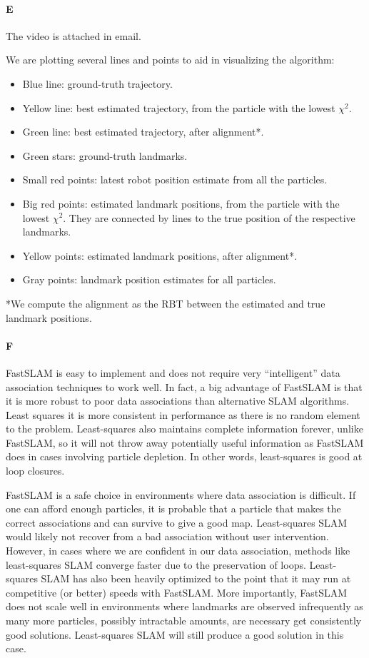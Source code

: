 \documentclass[12pt]{article}
\begin{document}
\paragraph{E}
The video is attached in email.

We are plotting several lines and points to aid in visualizing the algorithm:
\begin{itemize}
	\item Blue line: ground-truth trajectory.
	\item Yellow line: best estimated trajectory, from the particle with the lowest $\chi^2$.
	\item Green line: best estimated trajectory, after alignment*.
	\item Green stars: ground-truth landmarks.
	\item Small red points: latest robot position estimate from all the particles.
	\item Big red points: estimated landmark positions, from the particle with the lowest $\chi^2$. They are connected by lines to the true position of the respective landmarks.
	\item Yellow points: estimated landmark positions, after alignment*.
	\item Gray points: landmark position estimates for all particles.
\end{itemize}

*We compute the alignment as the RBT between the estimated and true landmark positions.

\paragraph{F}
FastSLAM is easy to implement and does not require very ``intelligent'' data
association techniques to work well. In fact, a big advantage of FastSLAM is
that it is more robust to poor data associations than alternative SLAM
algorithms. Least squares it is more consistent in performance as
there is no random element to the problem. Least-squares also maintains
complete information forever, unlike FastSLAM, so it will not throw away
potentially useful information as FastSLAM does in cases involving particle
depletion. In other words, least-squares is good at loop closures.

FastSLAM is a safe choice in environments where data association is difficult.
If one can afford enough particles, it is probable that a particle that makes
the correct associations and can survive to give a good map. Least-squares SLAM
would likely not recover from a bad association without user intervention. However,
in cases where we are confident in our data association, methods like
least-squares SLAM converge faster due to the preservation of loops. Least-squares SLAM
has also been heavily optimized to the point that it may run at competitive (or better) speeds
with FastSLAM. More importantly, FastSLAM does not scale well in environments where
landmarks are observed infrequently as many more particles, possibly intractable amounts, are necessary get consistently
good solutions. Least-squares SLAM will still produce a good solution in this case.
\end{document}
